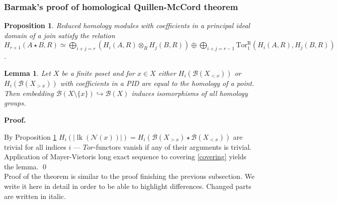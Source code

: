 \documentclass[a4paper, 12pt]{article}
\newcounter{stmcounter}[section]
\numberwithin{equation}{section}
\newtheorem{proposition}[stmcounter]{Proposition}
\newtheorem{lemma}[stmcounter]{Lemma}
\theoremstyle{definition}
\theoremstyle{remark}
\newenvironment{pf}{\noindent\textbf{Proof.}}{\qed}
\begin{document}
\subsubsection{Barmak's proof of homological Quillen-McCord theorem}

\begin{proposition} {\cite[Lemma 2.1]{Milnor56}}
  \label{prop:kunneth}
  Reduced homology modules with coefficients in a principal ideal domain of a join satisfy the relation
  $H_{r+1}(A \star B, R) \simeq \bigoplus_{i+j=r}(H_i(A,R) \otimes_R H_j(B,R)) \oplus \bigoplus_{i+j=r-1} \operatorname{Tor_1^R}(H_i(A,R),H_j(B,R))$.
\end{proposition}

\begin{lemma}
  \label{lem:trivialties}
  Let $X$ be a finite poset and for $x \in X$ either $H_i(\mathcal{B}(X_{< x}))$ or $H_i(\mathcal{B}(X_{> x}))$ with coefficients in a PID are equal to the homology of a point. Then embedding $\mathcal{B}(X \setminus \{x\}) \hookrightarrow \mathcal{B}(X)$ induces isomorphisms of all homology groups.
\end{lemma}

\begin{pf} ~ \par
  By Proposition \ref{prop:kunneth} $H_i(\left|\operatorname{lk}(\mathcal{N}(x))\right|) = H_i(\mathcal{B}(X_{>x}) \star \mathcal{B}(X_{<x}))$ are trivial for all indices $i$ --- $Tor$-functors vanish if any of their arguments is trivial.
  Application of Mayer-Vietoris long exact sequence to covering \eqref{covering} yields the lemma.
\end{pf}\\

Proof of the theorem is similar to the proof finishing the previous subsection. We write it here in detail in order to be able to highlight differences. Changed parts are written in italic.\\
\end{document}
